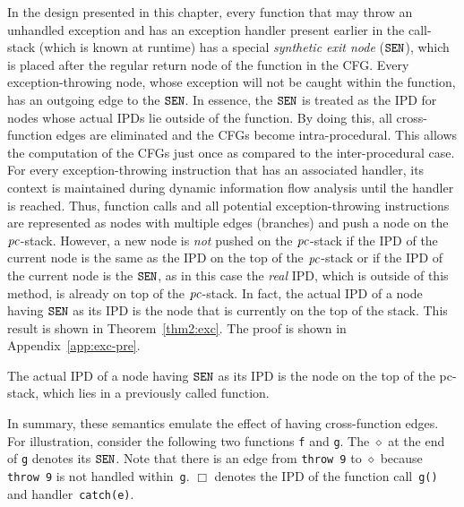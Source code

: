 In the design presented in this chapter, every function that may throw
an unhandled exception and has an exception handler present earlier in
the call-stack (which is known at runtime) has a special
\emph{synthetic exit node} ($\texttt{SEN}$), which is placed after the regular
return node of the function in the CFG. 
Every exception-throwing node, whose exception will not be caught
within the function, has an outgoing edge to the $\texttt{SEN}$. In essence, the
$\texttt{SEN}$ is treated as the IPD for nodes whose actual IPDs lie outside of
the function. By doing this, all cross-function edges are eliminated
and the CFGs become intra-procedural. This allows the computation of
the CFGs just once as compared to the inter-procedural case. 
For every exc\-ep\-tion-throw\-ing instruction that has an associated
handler, its context is maintained during dynamic information flow
analysis until the handler is reached. 
Thus, function calls and all potential exception-throwing
instructions are represented as nodes with multiple edges (bra\-nches) 
and push a node on the $\mathit{pc}$-stack. However, a new node is \emph{not} 
pushed on the $\mathit{pc}$-stack if the IPD of the current node is the same
as the IPD on the top of the $\mathit{pc}$-stack or if the IPD of the current
node is the $\texttt{SEN}$, as in this case the \emph{real} IPD, which is outside
of this method, is already on top of the $\mathit{pc}$-stack. In fact, the
actual IPD of a node having $\texttt{SEN}$ as its IPD is the node that is
currently on the top of the stack. This result is shown in
Theorem~\ref{thm2:exc}. The proof is shown in Appendix~\ref{app:exc-pre}.

\begin{myThm}\label{thm2:exc}
The actual IPD of a node having $\texttt{SEN}$ as its IPD is the node on
the top of the pc-stack, which lies in a previously called function.
\end{myThm}

In summary, these semantics emulate the effect of having cross-function edges. 
For illustration, consider the following two functions \texttt{f} and
\texttt{g}. The $\diamond$ at the end of \texttt{g} denotes its
$\texttt{SEN}$. Note that there is an edge from \texttt{throw 9} to $\diamond$
because \texttt{throw 9} is not handled within~\texttt{g}. $\Box$
denotes the IPD of the function call~\texttt{g()} and handler~\texttt{catch(e)}.

